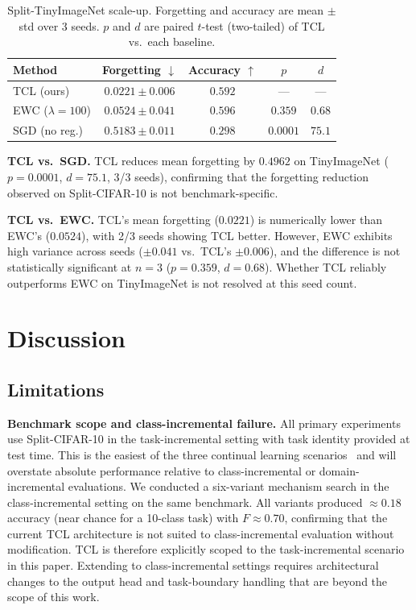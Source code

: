 \documentclass[10pt,a4paper]{article}
\begin{document}
\begin{table}[h]
\centering
\caption{Split-TinyImageNet scale-up. Forgetting and accuracy are
mean $\pm$ std over 3 seeds. $p$ and $d$ are paired $t$-test (two-tailed)
of TCL vs.\ each baseline.}
\label{tab:tinyimagenet}
\begin{tabular}{lcccc}
\toprule
Method & Forgetting $\downarrow$ & Accuracy $\uparrow$ & $p$ & $d$ \\
\midrule
TCL (ours)   & $\mathbf{0.0221 \pm 0.006}$ & $0.592$ & --- & --- \\
EWC ($\lambda=100$) & $0.0524 \pm 0.041$ & $0.596$ & $0.359$ & $0.68$ \\
SGD (no reg.) & $0.5183 \pm 0.011$ & $0.298$ & $0.0001$ & $75.1$ \\
\bottomrule
\end{tabular}
\end{table}

\textbf{TCL vs.\ SGD.} TCL reduces mean forgetting by $0.4962$ on TinyImageNet
($p = 0.0001$, $d = 75.1$, 3/3 seeds), confirming that the forgetting reduction
observed on Split-CIFAR-10 is not benchmark-specific.

\textbf{TCL vs.\ EWC.} TCL's mean forgetting ($0.0221$) is numerically lower
than EWC's ($0.0524$), with 2/3 seeds showing TCL better. However, EWC exhibits
high variance across seeds ($\pm 0.041$ vs.\ TCL's $\pm 0.006$), and the
difference is not statistically significant at $n = 3$ ($p = 0.359$, $d = 0.68$).
Whether TCL reliably outperforms EWC on TinyImageNet is not resolved at this
seed count.


\section{Discussion}
\label{sec:discussion}

\subsection{Limitations}

\textbf{Benchmark scope and class-incremental failure.}
All primary experiments use Split-CIFAR-10 in the task-incremental setting with
task identity provided at test time.
This is the easiest of the three continual learning scenarios~\cite{vandeVen2019}
and will overstate absolute performance relative to class-incremental or
domain-incremental evaluations.
We conducted a six-variant mechanism search in the class-incremental setting on the
same benchmark.
All variants produced $\approx 0.18$ accuracy (near chance for a 10-class task) with
$F \approx 0.70$, confirming that the current TCL architecture is not suited to
class-incremental evaluation without modification.
TCL is therefore explicitly scoped to the task-incremental scenario in this paper.
Extending to class-incremental settings requires architectural changes to the output
head and task-boundary handling that are beyond the scope of this work.
\end{document}
